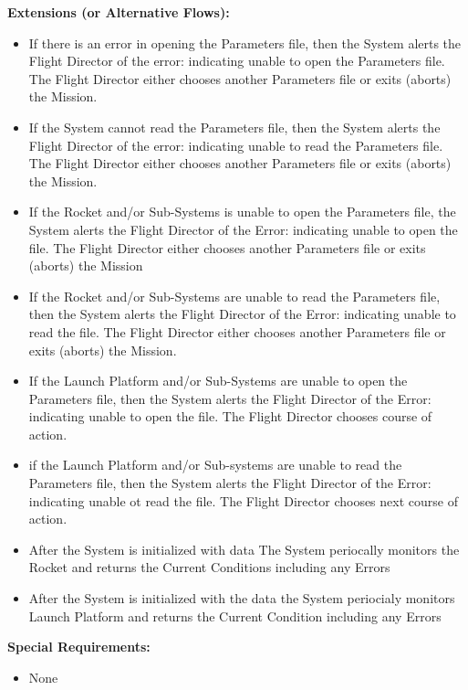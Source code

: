 \documentclass[letterpaper]{article}
\begin{document}
\textbf{Extensions (or Alternative Flows):}
\begin{itemize}
   \item[2a.]If there is an error in opening the Parameters file,
      then the System alerts the Flight Director of the error:
      indicating unable to open the Parameters file.  The Flight 
      Director either chooses another Parameters file or exits 
      (aborts) the Mission.
   \item[3a.]If the System cannot read the Parameters file, then the
      System alerts the Flight Director of the error:  indicating
      unable to read the Parameters file.  The Flight Director either
      chooses another Parameters file or exits (aborts) the Mission.
   \item[4a.]If the Rocket and/or Sub-Systems is unable to open the 
      Parameters file, the System alerts the Flight Director of the 
      Error: indicating unable to open the file.  The Flight Director
      either chooses another Parameters file or exits (aborts) the
      Mission
   \item[4b.]If the Rocket and/or Sub-Systems are unable to read the 
      Parameters file, then the System alerts the Flight Director of 
      the Error:  indicating unable to read the file. The Flight 
      Director either chooses another Parameters file or exits 
      (aborts) the Mission.
   \item[6a.]If the Launch Platform and/or Sub-Systems are unable to
      open the Parameters file, then the System alerts the Flight
      Director of the Error:  indicating unable to open the file.  The
      Flight Director chooses course of action.
   \item[6b.]if the Launch Platform and/or Sub-systems are unable to
      read the Parameters file, then the System alerts the Flight
      Director of the Error:  indicating unable ot read the file.  The
      Flight Director chooses next course of action.
   \item[7a+]After the System is initialized with data The System 
      periocally monitors the Rocket and returns the Current 
      Conditions including any Errors
   \item[7b+]After the System is initialized with the data the System
      periocialy monitors Launch Platform and returns the Current
      Condition including any Errors
\end{itemize}
\textbf{Special Requirements:}
\begin{itemize}
   \item None
\end{itemize}
\end{document}
